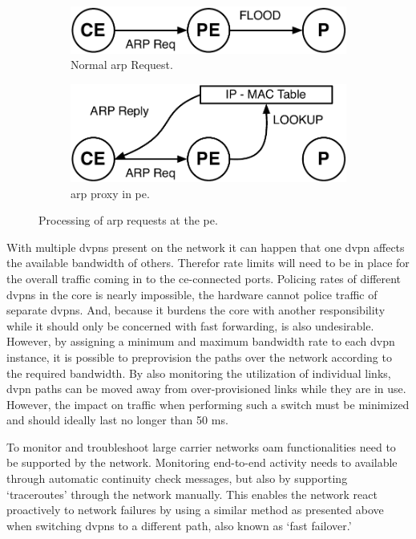 \begin{figure}[!h]
	\centering
	\begin{subfigure}[b]{0.3\textwidth}
		\centering
		\includegraphics[width=\textwidth]{./includes/arp-no-proxy.pdf}
		\caption{Normal \acs{arp} Request.}
		\label{fig:arp-no-proxy}
	\end{subfigure}\hspace*{1cm}
	\begin{subfigure}[b]{0.3\textwidth}
	\centering
		\includegraphics[width=\textwidth]{./includes/arp-proxy.pdf}
		\caption{\acs{arp} proxy in \ac{pe}.}
		\label{fig:arp-proxy}
	\end{subfigure}
	\caption{Processing of \acs{arp} requests at the \ac{pe}.}
\end{figure}

With multiple \acp{dvpn} present on the network it can happen that one \ac{dvpn} affects the available bandwidth of others. Therefor rate limits will need to be in place for the overall traffic coming in to the \ac{ce}-connected ports. Policing rates of different \acp{dvpn} in the core is nearly impossible, the hardware cannot police traffic of separate \acp{dvpn}. And, because it burdens the core with another responsibility while it should only be concerned with fast forwarding, is also undesirable. However, by assigning a minimum and maximum bandwidth rate to each \ac{dvpn} instance, it is possible to preprovision the paths over the network according to the required bandwidth. By also monitoring the utilization of individual links, \ac{dvpn} paths can be moved away from over-provisioned links while they are in use. However, the impact on traffic when performing such a switch must be minimized and should ideally last no longer than 50 ms.

To monitor and troubleshoot large carrier networks \ac{oam} functionalities need to be supported by the network. Monitoring end-to-end activity needs to available through automatic continuity check messages, but also by supporting `traceroutes' through the network manually. This enables the network react proactively to network failures by using a similar method as presented above when switching \acp{dvpn} to a different path, also known as `fast failover.'


